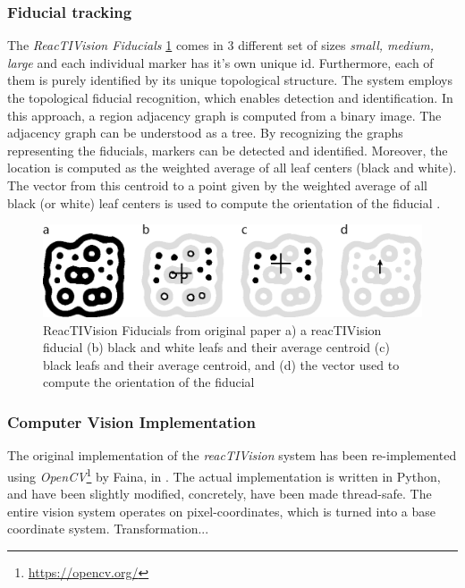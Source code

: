 \subsubsection{Fiducial tracking}

The \emph{ReacTIVision Fiducials} \ref{fig:fiducial_markers} comes in 3 different set of sizes \emph{small, medium, large} and each individual marker has it's own unique id. Furthermore, each of them is purely identified by its unique topological structure. The system employs the topological fiducial recognition, which enables detection and identification. In this approach, a region adjacency graph is computed from a binary image. The adjacency graph can be understood as a tree. By recognizing the graphs representing the fiducials, markers can be detected and identified. Moreover, the location is computed as the weighted average of all leaf centers (black and white). The vector from this centroid to a point given by the weighted average of all black (or white) leaf centers is used to compute the orientation of the fiducial \citep{bencina2005improved}.

\begin{figure}[H]
  \centering
  \includegraphics[width=0.66\linewidth]{include/images/fiducial_markers.PNG}
  \caption{ReacTIVision Fiducials from original paper a) a reacTIVision fiducial (b) black and white leafs and their average centroid (c) black leafs and their average centroid, and (d) the vector used to compute the orientation of the fiducial}
  \label{fig:fiducial_markers}
\end{figure}

\subsubsection{Computer Vision Implementation}

The original implementation of the \emph{reacTIVision} system has been re-implemented using \emph{OpenCV}\footnote{\url{https://opencv.org/}} by Faina, in \citep{faina2017automating}. The actual implementation is written in Python, and have been slightly modified, concretely, have been made thread-safe. The entire vision system operates on pixel-coordinates, which is turned into a base coordinate system. Transformation...

